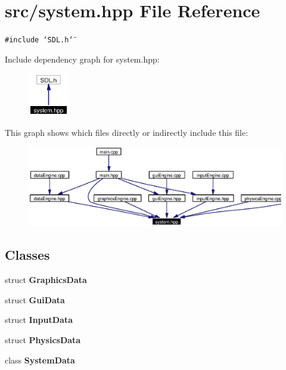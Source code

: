 \section{src/system.hpp File Reference}
\label{system_8hpp}
{\tt \#include \char`\"{}SDL.h\char`\"{}}\par


Include dependency graph for system.hpp:\begin{figure}[H]
\begin{center}
\leavevmode
\includegraphics[width=50pt]{system_8hpp__incl}
\end{center}
\end{figure}


This graph shows which files directly or indirectly include this file:\begin{figure}[H]
\begin{center}
\leavevmode
\includegraphics[width=342pt]{system_8hpp__dep__incl}
\end{center}
\end{figure}
\subsection*{Classes}
\begin{CompactItemize}
\item 
struct {\bf Graphics\-Data}
\item 
struct {\bf Gui\-Data}
\item 
struct {\bf Input\-Data}
\item 
struct {\bf Physics\-Data}
\item 
class {\bf System\-Data}
\end{CompactItemize}
